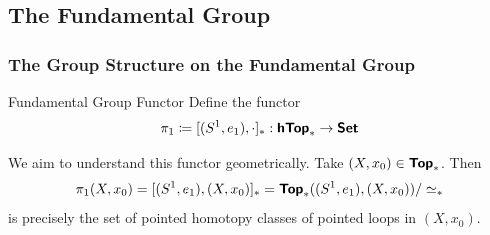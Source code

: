 \subsection{The Fundamental Group}


\subsubsection{The Group Structure on the Fundamental Group}

\begin{definition}{Fundamental Group Functor}{}
  Define the functor \[
  \pi_1\coloneq [(S^1,e_1),\cdot]_*:\bm{\mathsf{hTop}}_* \to \bm{\mathsf{Set}}
  \]
\end{definition}

We aim to understand this functor geometrically. Take $(X,x_0)\in\bm{\mathsf{Top}}_*$. Then \[
\pi_1(X,x_0)=[(S^1,e_1),(X,x_0)]_* = \bm{\mathsf{Top}}_*((S^1,e_1),(X,x_0))/\simeq_*
\]
is precisely the set of pointed homotopy classes of pointed loops in $(X,x_0)$.

